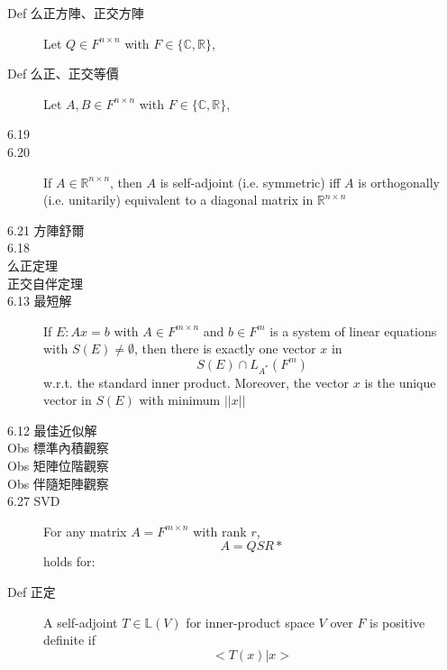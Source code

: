 \documentclass[9pt, twocolumn]{extarticle}
\newcommand{\realnum}{\mathbb{R}}
\newcommand{\complexnum}{\mathbb{C}}
\newcommand{\ltrans}{\mathbb{L}}
\begin{document}
\begin{description}
    \item[Def 么正方陣、正交方陣] Let $Q \in F^{n\times n}$ with $F \in \{\complexnum, \realnum\}$,
    \item[Def 么正、正交等價] Let $A, B \in F^{n \times n}$ with $F \in \{\complexnum, \realnum\}$,
    \item[6.19]
    \item[6.20] If $A \in \realnum^{n\times n}$, then $A$ is self-adjoint (i.e. symmetric) iff $A$ is orthogonally (i.e. unitarily) equivalent to a diagonal matrix in $\realnum^{n\times n}$
   
    \item[6.21 方陣舒爾]
    \item[6.18]
        
    \item[么正定理] 
    \item[正交自伴定理]
    \item[6.13 最短解] If $E: Ax = b$ with $A \in F^{m\times n}$ and $b \in F^m$ is a system of linear equations with $S(E) \neq \emptyset$, then there is exactly one vector $x$ in \[S(E) \cap L_{A^*}(F^m)\] w.r.t. the standard inner product. Moreover, the vector $x$ is the unique vector in $S(E)$ with minimum $||x||$
    \item[6.12 最佳近似解]
    \item[Obs 標準內積觀察]
    \item[Obs 矩陣位階觀察]
    \item[Obs 伴隨矩陣觀察]
        
    \item[6.27 SVD] For any matrix $A = F^{m\times n}$ with rank $r$, \[A = QSR*\] holds for:

    \item[Def 正定] A self-adjoint $T \in \ltrans(V)$ for inner-product space $V$ over $F$ is positive definite if \[<T(x)|x>\]


\end{description}
\end{document}
